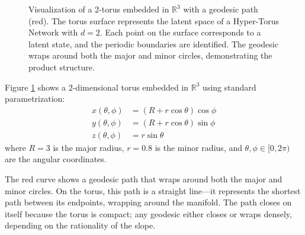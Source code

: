 \documentclass[12pt,letterpaper,twoside]{article}
\newcommand{\R}{\mathbb{R}}
\begin{document}
\begin{figure}[htbp]
    \centering
    \caption{Visualization of a 2-torus embedded in $\R^3$ with a geodesic path (red). The torus surface represents the latent space of a Hyper-Torus Network with $d=2$. Each point on the surface corresponds to a latent state, and the periodic boundaries are identified. The geodesic wraps around both the major and minor circles, demonstrating the product structure.}
    \label{fig:torus}
\end{figure}

Figure \ref{fig:torus} shows a 2-dimensional torus embedded in $\R^3$ using standard parametrization:
\begin{align}
x(\theta, \phi) &= (R + r\cos\theta)\cos\phi \\
y(\theta, \phi) &= (R + r\cos\theta)\sin\phi \\
z(\theta, \phi) &= r\sin\theta
\end{align}
where $R = 3$ is the major radius, $r = 0.8$ is the minor radius, and $\theta, \phi \in [0, 2\pi)$ are the angular coordinates.

The red curve shows a geodesic path that wraps around both the major and minor circles. On the torus, this path is a straight line—it represents the shortest path between its endpoints, wrapping around the manifold. The path closes on itself because the torus is compact; any geodesic either closes or wraps densely, depending on the rationality of the slope.
\end{document}
